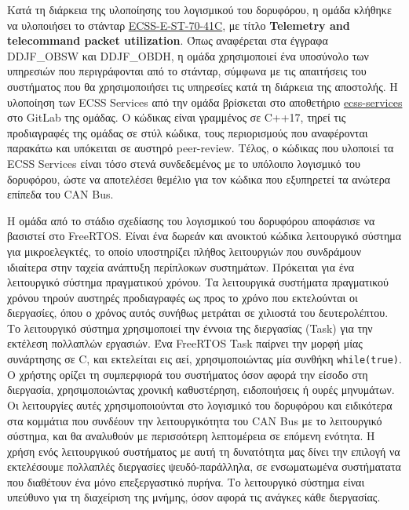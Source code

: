 \documentclass[a4paper,nobib,justified]{tufte-book}
\begin{document}
Κατά τη διάρκεια της υλοποίησης του λογισμικού του δορυφόρου, η ομάδα κλήθηκε να υλοποιήσει το στάνταρ \href{url}{ECSS-E-ST-70-41C}, με τίτλο \textbf{Telemetry and telecommand packet utilization}. Όπως αναφέρεται στα έγγραφα DDJF\_OBSW και DDJF\_OBDH, η ομάδα χρησιμοποιεί ένα υποσύνολο των υπηρεσιών που περιγράφονται από το στάνταρ, σύμφωνα με τις απαιτήσεις του συστήματος που θα χρησιμοποιήσει τις υπηρεσίες κατά τη διάρκεια της αποστολής. Η υλοποίηση των ECSS Services από την ομάδα βρίσκεται στο αποθετήριο \href{https://gitlab.com/acubesat/obc/ecss-services}{ecss-services} στο GitLab της ομάδας. Ο κώδικας είναι γραμμένος σε C++17, τηρεί τις προδιαγραφές της ομάδας σε στύλ κώδικα, τους περιορισμούς που αναφέρονται παρακάτω και υπόκειται σε αυστηρό peer-review. Τέλος, ο κώδικας που υλοποιεί τα ECSS Services είναι τόσο στενά συνδεδεμένος με το υπόλοιπο λογισμικό του δορυφόρου, ώστε να αποτελέσει θεμέλιο για τον κώδικα που εξυπηρετεί τα ανώτερα επίπεδα του CAN Bus. 

\par Η ομάδα από το στάδιο σχεδίασης του λογισμικού του δορυφόρου αποφάσισε να βασιστεί στο FreeRTOS. Είναι ένα δωρεάν και ανοικτού κώδικα λειτουργικό σύστημα για μικροελεγκτές, το οποίο υποστηρίζει πλήθος λειτουργιών που συνδράμουν ιδιαίτερα στην ταχεία ανάπτυξη περίπλοκων συστημάτων. Πρόκειται για ένα λειτουργικό σύστημα πραγματικού χρόνου. Τα λειτουργικά συστήματα πραγματικού χρόνου τηρούν αυστηρές προδιαγραφές ως προς το χρόνο που εκτελούνται οι διεργασίες, όπου ο χρόνος αυτός συνήθως μετράται σε χιλιοστά του δευτερολέπτου. Το λειτουργικό σύστημα χρησιμοποιεί την έννοια της διεργασίας (Task) για την εκτέλεση πολλαπλών εργασιών. Ένα FreeRTOS Task παίρνει την μορφή μίας συνάρτησης σε C, και εκτελείται εις αεί, χρησιμοποιώντας μία συνθήκη \texttt{while(true)}. Ο χρήστης ορίζει τη συμπερφιορά του συστήματος όσον αφορά την είσοδο στη διεργασία, χρησιμοποιώντας χρονική καθυστέρηση, ειδοποιήσεις ή ουρές μηνυμάτων. Οι λειτουργίες αυτές χρησιμοποιούνται στο λογισμικό του δορυφόρου και ειδικότερα στα κομμάτια που συνδέουν την λειτουργικότητα του CAN Bus με το λειτουργικό σύστημα, και θα αναλυθούν με περισσότερη λεπτομέρεια σε επόμενη ενότητα. Η χρήση ενός λειτουργικού συστήματος με αυτή τη δυνατότητα μας δίνει την επιλογή να εκτελέσουμε πολλαπλές διεργασίες ψευδό-παράλληλα, σε ενσωματωμένα συστήματατα που διαθέτουν ένα μόνο επεξεργαστικό πυρήνα. Το λειτουργικό σύστημα είναι υπεύθυνο για τη διαχείριση της μνήμης, όσον αφορά τις ανάγκες κάθε διεργασίας.
\end{document}
